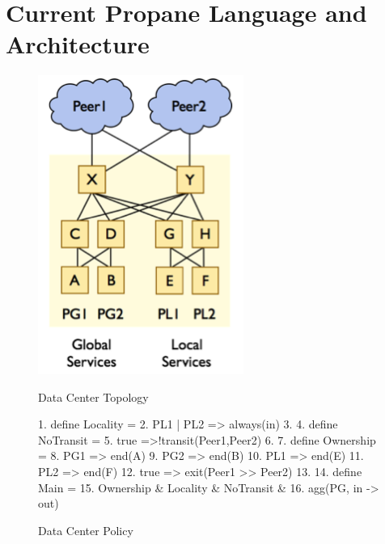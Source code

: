 \section{Current Propane Language and Architecture}
\label{sec:propane}

\begin{figure}[t]
    \centering
    \begin{minipage}{.5\textwidth}
        \centering
        \includegraphics[width=0.6\textwidth]{figures/datacenter-topo}
        \caption{Data Center Topology}
        \label{fig:data-center-topo}
    \end{minipage}%
    \begin{minipage}{0.5\textwidth}
        \centering
\begin{mylisting}
 1. define Locality = 
 2.   {PL1 | PL2 => always(in)}
 3. 
 4. define NoTransit = 
 5.  {true =>!transit({Peer1,Peer2})}
 6.
 7. define Ownership = 
 8.  {PG1   => end(A)
 9.   PG2   => end(B)
10.   PL1   => end(E)
11.   PL2   => end(F)
12.   true => exit(Peer1 >> Peer2)}
13.
14. define Main =
15.   Ownership & Locality & NoTransit & 
16.   agg(PG, in -> out)
\end{mylisting}
        \caption{Data Center Policy}
        \label{fig:policy}
    \end{minipage}
\end{figure}

